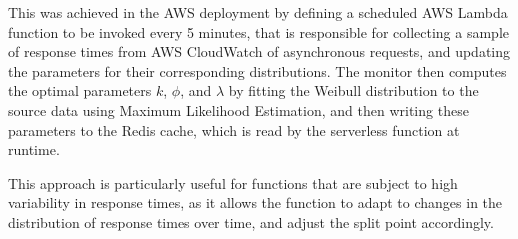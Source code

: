 This was achieved in the AWS deployment by defining a scheduled AWS Lambda function to be invoked every 5 minutes, that is responsible for collecting a sample of response times from AWS CloudWatch of asynchronous requests, and updating the parameters for their corresponding distributions. The monitor then computes the optimal parameters $k$, $\phi$, and $\lambda$ by fitting the Weibull distribution to the source data using Maximum Likelihood Estimation, and then writing these parameters to the Redis cache, which is read by the serverless function at runtime.

This approach is particularly useful for functions that are subject to high variability in response times, as it allows the function to adapt to changes in the distribution of response times over time, and adjust the split point accordingly.
